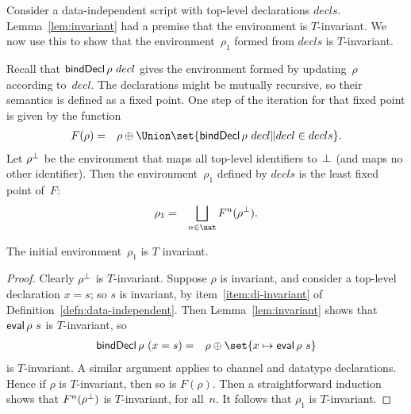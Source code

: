 

Consider a data-independent script with top-level declarations $decls$.
Lemma~\ref{lem:invariant} had a premise that the environment is $T$-invariant.
We now use this to show that the environment~$\rho_1$ formed from $decls$ is
$T$-invariant.

Recall that $\mathop{\sf bindDecl} \rho~decl$ gives the environment formed by
updating~$\rho$ according to~$decl$.  The declarations might be mutually
recursive, so their semantics is defined as a fixed point.  One step of the
iteration for that fixed point is given by the function
%
\begin{eqnarray*}
F(\rho) & = & \rho \oplus \Union \set{\bindDecl \rho ~ decl \| decl \in decls}.
\end{eqnarray*}
%
Let $\rho^\perp$ be the environment that maps all top-level identifiers
to~$\perp$ (and maps no other identifier).  Then the environment~$\rho_1$
defined by $decls$ is the least fixed point of~$F$:
\begin{eqnarray*}
\rho_1 & = & \bigsqcup_{n \in \nat} F^n(\rho^\bottom).
\end{eqnarray*}


\begin{prop}
The initial environment~$\rho_1$ is $T$ invariant.
\end{prop}

\begin{proof}
Clearly $\rho^\perp$ is $T$-invariant.  
%
Suppose $\rho$ is invariant, and consider a top-level declaration $x = s$;
so $s$ is invariant, by item~\ref{item:di-invariant} of
Definition~\ref{defn:data-independent}.  Then Lemma~\ref{lem:invariant} shows
that $\mathop{\sf eval} \rho~s$ is $T$-invariant, so 
\begin{eqnarray*}
\bindDecl \rho~(x = s) & = & \rho \oplus \set{x \mapsto \eval \rho~s}
\end{eqnarray*}
is $T$-invariant.  A similar argument applies to channel and datatype
declarations.  Hence if $\rho$ is $T$-invariant, then so is $F(\rho)$.
%
Then a straightforward induction shows that $F^n(\rho^\perp)$ is
$T$-invariant, for all~$n$.  It follows that $\rho_1$ is $T$-invariant.
\end{proof}


